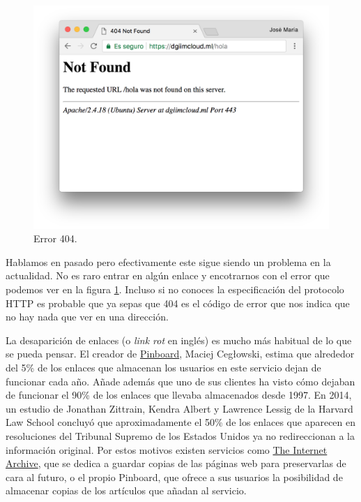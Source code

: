 \documentclass[12pt]{article} %
\begin{document}
\begin{figure}[h]
\includegraphics[width=\textwidth]{404}
\caption{Error 404.}
\label{fig:404}
\end{figure}

Hablamos en pasado pero efectivamente este sigue siendo un problema en la actualidad. No es raro entrar en algún enlace y encotrarnos con el error que podemos ver en la figura \ref{fig:404}. Incluso si no conoces la especificación del protocolo HTTP es probable que ya sepas que 404 es el código de error que nos indica que no hay nada que ver en una dirección.

La desaparición de enlaces (o \textit{link rot} en inglés) es mucho más habitual de lo que se pueda pensar. El creador de \href{pinboard.in}{Pinboard}, Maciej Cegłowski, estima que alrededor del 5\% de los enlaces que almacenan los usuarios en este servicio dejan de funcionar cada año\cite{pinboard-dead-links}. Añade además que uno de sus clientes ha visto cómo dejaban de funcionar el 90\% de los enlaces que llevaba almacenados desde 1997. En 2014, un estudio de Jonathan Zittrain, Kendra Albert y Lawrence Lessig de la Harvard Law School concluyó que aproximadamente el 50\% de los enlaces que aparecen en resoluciones del Tribunal Supremo de los Estados Unidos ya no redireccionan a la información original\cite{scotus-dead-links}. Por estos motivos existen servicios como \href{https://archive.org/}{The Internet Archive}, que se dedica a guardar copias de las páginas web para preservarlas de cara al futuro, o el propio Pinboard, que ofrece a sus usuarios la posibilidad de almacenar copias de los artículos que añadan al servicio.
\end{document}
